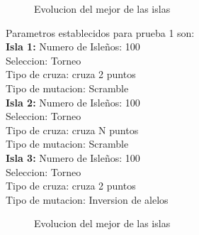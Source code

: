 \documentclass[10pt,letterpaper]{article}
\begin{document}
\begin{figure}[H]
      \begin{center}
        \caption{Evolucion del mejor de las islas}
        \label{Patron de señales para reconocimiento de señal Gaussiana}
      \end{center}
    \end{figure}

Parametros establecidos para prueba 1 son:
\\
\textbf{Isla 1:} Numero de Isleños: 100\\
Seleccion: Torneo\\ 
Tipo de cruza: cruza 2 puntos\\
Tipo de mutacion: Scramble\\
\textbf{Isla 2:} Numero de Isleños: 100\\
Seleccion: Torneo\\ 
Tipo de cruza: cruza N puntos\\
Tipo de mutacion: Scramble\\
\textbf{Isla 3:} Numero de Isleños: 100\\
Seleccion: Torneo\\ 
Tipo de cruza: cruza 2 puntos\\
Tipo de mutacion: Inversion de alelos

\begin{figure}[H]
      \begin{center}
        \caption{Evolucion del mejor de las islas}
        \label{Patron de señales para reconocimiento de señal Gaussiana}
      \end{center}
    \end{figure}
\end{document}
